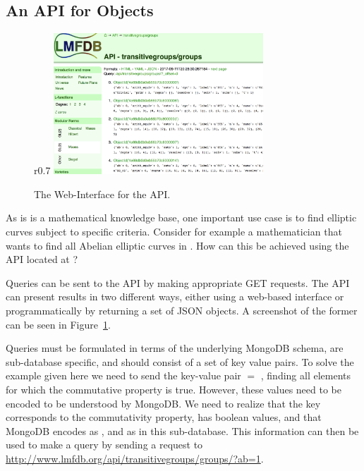 \subsection{An API for \lmfdb Objects}\label{sec:sota:api}

\begin{figure}r{0.7\textwidth}\centering\vspace*{-2.5em}
  \includegraphics[width=0.7\textwidth]{APIScreenshot}\vspace*{-2.5em}
  \caption[The Web-Interface for the \lmfdb API. ]{
    The Web-Interface for the \lmfdb API. 
  }\vspace*{-1.5em}
  \label{fig:apiscreenshot}
\end{figure}
As \lmfdb is is a mathematical knowledge base, one important use case is to find elliptic curves subject to specific criteria. 
Consider for example a mathematician that wants to find all Abelian elliptic curves in \lmfdb. 
How can this be achieved using the \lmfdb API located at \cite{lmfdbapi}? 

Queries can be sent to the API by making appropriate GET requests. 
The \lmfdb API can present results in two different ways, either using a web-based interface or programmatically by returning a set of JSON objects. 
A screenshot of the former can be seen in Figure~\ref{fig:apiscreenshot}. 

Queries must be formulated in terms of the underlying MongoDB schema, are sub-database specific, and should consist of a set of key value pairs. 
To solve the example given here we need to send the key-value pair $ = $ , finding all elements for which the commutative property is true. 
However, these values need to be encoded to be understood by MongoDB. 
We need to realize that the  key corresponds to the commutativity property, has boolean values, and that MongoDB encodes  as , and  as  in this \lmfdb sub-database. 
This information can then be used to make a query by sending a request to \url{http://www.lmfdb.org/api/transitivegroups/groups/?ab=1}. 

